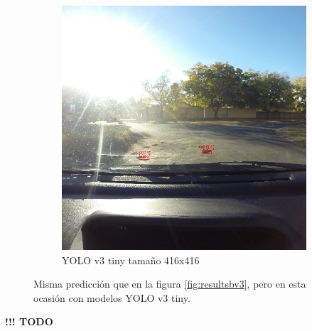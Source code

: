 \begin{figure}[H]
\begin{subfigure}[h]{0.45\linewidth}
		\includegraphics[width=\linewidth]{images/results_b_yolo_v3_tiny_416.jpg}
		\caption{YOLO v3 tiny tamaño 416x416}
	\end{subfigure}
	\caption{Misma predicción que en la figura \ref{fig:resultsbv3}, pero en esta ocasión con modelos YOLO v3 tiny.}
	\label{fig:resultsbv3tiny}
\end{figure}

{\color{red} \textbf{!!! TODO}}